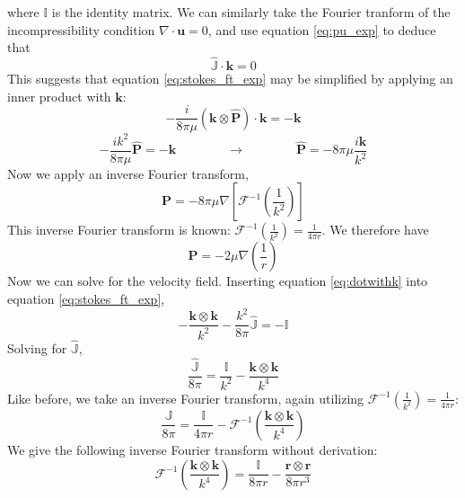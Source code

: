 \documentclass[11pt]{ucthesis}
\begin{document}
where $\mathbb{I}$ is the identity matrix. We can similarly take the Fourier tranform of the incompressibility condition $\nabla\cdot\mathbf{u} = 0$, and use equation \ref{eq:pu_exp} to deduce that
\begin{equation}
\hat{\mathbb{J}}\cdot \mathbf{k} = 0
\end{equation}
This suggests that equation \ref{eq:stokes_ft_exp} may be simplified by applying an inner product with $\mathbf{k}$:
\[
-\frac{i}{8\pi\mu}(\mathbf{k}\otimes\hat{\mathbf{P}})\cdot\mathbf{k} = -\mathbf{k}
\]
\begin{equation}
\label{eq:dotwithk}
-\frac{ik^2}{8\pi\mu}\hat{\mathbf{P}} = -\mathbf{k} \qquad\qquad\rightarrow\qquad\qquad \hat{\mathbf{P}} = -8\pi\mu\frac{i\mathbf{k}}{k^2}
\end{equation}
Now we apply an inverse Fourier transform,
\begin{equation}
\mathbf{P} = -8\pi\mu \nabla \left[\mathcal{F}^{-1}\left(\frac{1}{k^2}\right)\right]
\end{equation}
This inverse Fourier transform is known: $\mathcal{F}^{-1}\left(\frac{1}{k^2}\right) = \frac{1}{4\pi r}$. We therefore have
\begin{equation}
\label{eq:Pfinal}
\mathbf{P} = -2\mu \nabla \left(\frac1r\right)
\end{equation}
Now we can solve for the velocity field. Inserting equation \ref{eq:dotwithk} into equation \ref{eq:stokes_ft_exp},
\begin{equation}
\label{eq:subinP}
-\frac{\mathbf{k}\otimes\mathbf{k}}{k^2} - \frac{k^2}{8\pi}\hat{\mathbb{J}} = -\mathbb{I}
\end{equation}
Solving for $\hat{\mathbb{J}}$,
\begin{equation}
\label{eq:Jhat}
\frac{\hat{\mathbb{J}}}{8\pi} = \frac{\mathbb{I}}{k^2} - \frac{\mathbf{k}\otimes\mathbf{k}}{k^4}
\end{equation}
Like before, we take an inverse Fourier transform, again utilizing $\mathcal{F}^{-1}\left(\frac{1}{k^2}\right) = \frac{1}{4\pi r}$:
\begin{equation}
\label{eq:JwithIFT}
\frac{\mathbb{J}}{8\pi} = \frac{\mathbb{I}}{4\pi r} - \mathcal{F}^{-1}\left(\frac{\mathbf{k}\otimes\mathbf{k}}{k^4}\right)
\end{equation}
We give the following inverse Fourier transform without derivation:
\begin{equation}
\mathcal{F}^{-1}\left(\frac{\mathbf{k}\otimes\mathbf{k}}{k^4}\right) = \frac{\mathbb{I}}{8\pi r} - \frac{\mathbf{r\otimes r}}{8\pi r^3}
\end{equation}
\end{document}
